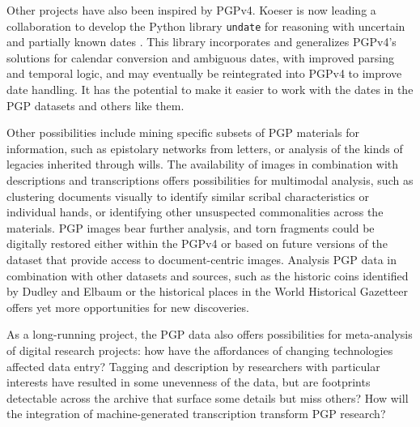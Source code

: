 \documentclass{article}
\begin{document}
Other projects have also been inspired by PGPv4. Koeser is now leading a collaboration to develop the Python library \texttt{undate} for reasoning with uncertain and partially known dates \autocite{koeser_undate_2024}. This library incorporates and generalizes PGPv4’s solutions for calendar conversion and ambiguous dates, with improved parsing and temporal logic, and may eventually be reintegrated into PGPv4 to improve date handling. It has the potential to make it easier to work with the dates in the PGP datasets and others like them.

Other possibilities include mining specific subsets of PGP materials for information, such as epistolary networks from letters, or analysis of the kinds of legacies inherited through wills. The availability of images in combination with descriptions and transcriptions offers possibilities for multimodal analysis, such as clustering documents visually to identify similar scribal characteristics or individual hands, or identifying other unsuspected commonalities across the materials. PGP images bear further analysis, and torn fragments could be digitally restored either within the PGPv4 or based on future versions of the dataset that provide access to document-centric images.  Analysis PGP data in combination with other datasets and sources, such as the historic coins identified by Dudley and Elbaum or the historical places in the World Historical Gazetteer offers yet more opportunities for new discoveries.

As a long-running project, the PGP data also offers possibilities for meta-analysis of digital research projects: how have the affordances of changing technologies affected data entry? Tagging and description by researchers with particular interests have resulted in some unevenness of the data, but are footprints detectable across the archive that surface some details but miss others? How will the integration of machine-generated transcription transform PGP research?

\pagebreak
{}

\printbibliography[prenote={preamble}]
\end{document}
